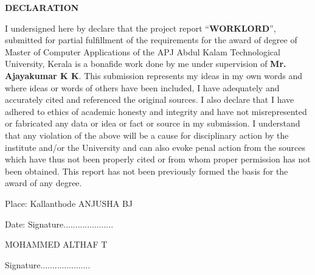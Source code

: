 \documentclass[a4paper,12pt]{report}
\begin{document}
\pagebreak


{\centering \bf \large
	DECLARATION\par
}

\vspace*{20pt}
{\normalsize I undersigned here by declare that the project report “{\bf WORKLORD}”, submitted for partial fulfillment of the requirements for the award of degree of Master
	of Computer Applications of the APJ Abdul Kalam Technological University, Kerala is a bonafide
	work done by me under supervision of {\bf Mr. Ajayakumar K K}. This submission represents my ideas in my
	own words and where ideas or words of others have been included, I have adequately and accurately
	cited and referenced the original sources. I also declare that I have adhered to ethics of academic
	honesty and integrity and have not misrepresented or fabricated any data or idea or fact or source
	in my submission. I understand that any violation of the above will be a cause for disciplinary action
	by the institute and/or the University and can also evoke penal action from the sources which have
	thus not been properly cited or from whom proper permission has not been obtained. This report
	has not been previously formed the basis for the award of any degree. } \\


\begin{center}\vspace*{20pt}
	Place: Kallanthode    \hspace*{0pt} \hfill ANJUSHA BJ
\end{center}

\begin{center}\vspace*{10pt}
	Date:      \hspace*{0pt} \hfill Signature.....................
\end{center}

\begin{center}\vspace*{10pt}
	\hspace*{0pt} \hfill MOHAMMED ALTHAF T \\
\end{center}

\begin{center}\vspace*{10pt}
	\hspace*{0pt} \hfill Signature.....................
\end{center}

\end{document}
